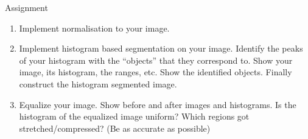 %
%
\begin{frame}[allowframebreaks]{Assignment}
\begin{enumerate}
\item Implement normalisation to your image. 

\item Implement histogram based segmentation on your image.
Identify the peaks of your histogram with the ``objects'' that
they correspond to.
Show your image, its histogram, the ranges, etc.
Show the identified objects.
Finally construct the histogram segmented image.


\item Equalize your image.
Show before and after images and histograms.
Is the histogram of the equalized image uniform?
Which regions got stretched/compressed?
(Be as accurate as possible)

\end{enumerate}
\end{frame}